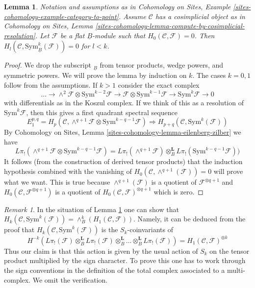 \documentclass[10pt,a4paper]{amsart}
\theoremstyle{plain}
\newtheorem{lemma}[subsection]{Lemma}
\theoremstyle{definition}
\theoremstyle{remark}
\newtheorem{remark}[subsection]{Remark}
\numberwithin{equation}{subsection}
\begin{document}
\begin{lemma}
\label{lemma-vanishing-symmetric-powers}
Notation and assumptions as in
Cohomology on Sites, Example \ref{sites-cohomology-example-category-to-point}.
Assume $\mathcal{C}$ has a cosimplicial object as in
Cohomology on Sites, Lemma
\ref{sites-cohomology-lemma-compute-by-cosimplicial-resolution}.
Let $\mathcal{F}$ be a flat $\underline{B}$-module such that
$H_0(\mathcal{C}, \mathcal{F}) = 0$.
Then $H_l(\mathcal{C}, \text{Sym}_{\underline{B}}^k(\mathcal{F})) = 0$
for $l < k$.
\end{lemma}

\begin{proof}
We drop the subscript ${}_{\underline{B}}$ from tensor products, wedge powers,
and symmetric powers. We will prove the lemma by induction on $k$.
The cases $k = 0, 1$ follow from the assumptions. If $k > 1$ consider
the exact complex
$$
\ldots \to
\wedge^2\mathcal{F} \otimes \text{Sym}^{k - 2}\mathcal{F} \to
\mathcal{F} \otimes \text{Sym}^{k - 1}\mathcal{F} \to
\text{Sym}^k\mathcal{F} \to 0
$$
with differentials as in the Koszul complex. If we think of this as a
resolution of $\text{Sym}^k\mathcal{F}$, then this gives a first quadrant
spectral sequence
$$
E_1^{p, q} =
H_p(\mathcal{C},
\wedge^{q + 1}\mathcal{F} \otimes \text{Sym}^{k - q - 1}\mathcal{F})
\Rightarrow
H_{p + q}(\mathcal{C}, \text{Sym}^k(\mathcal{F}))
$$
By Cohomology on Sites, Lemma \ref{sites-cohomology-lemma-eilenberg-zilber}
we have
$$
L\pi_!(\wedge^{q + 1}\mathcal{F} \otimes \text{Sym}^{k - q - 1}\mathcal{F}) =
L\pi_!(\wedge^{q + 1}\mathcal{F}) \otimes_B^\mathbf{L}
L\pi_!(\text{Sym}^{k - q - 1}\mathcal{F}))
$$
It follows (from the construction of derived tensor products) that
the induction hypothesis combined with the vanishing
of $H_0(\mathcal{C}, \wedge^{q + 1}(\mathcal{F})) = 0$ will prove what we want.
This is true because $\wedge^{q + 1}(\mathcal{F})$ is a quotient
of $\mathcal{F}^{\otimes q + 1}$ and
$H_0(\mathcal{C}, \mathcal{F}^{\otimes q + 1})$
is a quotient of $H_0(\mathcal{C}, \mathcal{F})^{\otimes q + 1}$
which is zero.
\end{proof}

\begin{remark}
\label{remark-first-homology-symmetric-power}
In the situation of Lemma \ref{lemma-vanishing-symmetric-powers}
one can show that
$H_k(\mathcal{C}, \text{Sym}^k(\mathcal{F})) =
\wedge^k_B(H_1(\mathcal{C}, \mathcal{F}))$.
Namely, it can be deduced from the proof that
$H_k(\mathcal{C}, \text{Sym}^k(\mathcal{F}))$ is the $S_k$-coinvariants
of
$$
H^{-k}(L\pi_!(\mathcal{F}) \otimes_B^\mathbf{L}
L\pi_!(\mathcal{F}) \otimes_B^\mathbf{L}
\ldots \otimes_B^\mathbf{L} L\pi_!(\mathcal{F})) =
H_1(\mathcal{C}, \mathcal{F})^{\otimes k}
$$
Thus our claim is that this action is given by the usual action
of $S_k$ on the tensor product multiplied by the sign character.
To prove this one has to work through the sign conventions
in the definition of the total complex associated to a
multi-complex. We omit the verification.
\end{remark}
\end{document}
